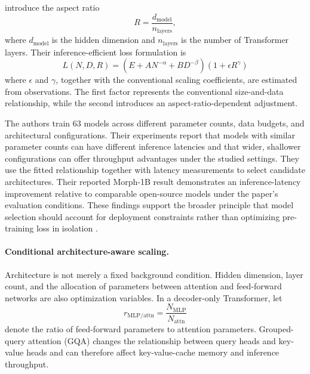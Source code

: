 \textcite{Bian2025InferenceEfficient} introduce the aspect ratio
\begin{equation}
    R=\frac{d_{\mathrm{model}}}{n_{\mathrm{layers}}},
    \label{eq:scaling-aspect-ratio}
\end{equation}
where \(d_{\mathrm{model}}\) is the hidden dimension and
\(n_{\mathrm{layers}}\) is the number of Transformer layers. Their
inference-efficient loss formulation is
\begin{equation}
    \boxed{
    L(N,D,R)
    =
    \left(E+AN^{-\alpha}+BD^{-\beta}\right)
    \left(1+\epsilon R^\gamma\right)
    }
    \label{eq:scaling-inference-efficient-law}
\end{equation}
where \(\epsilon\) and \(\gamma\), together with the conventional scaling
coefficients, are estimated from observations. The first factor represents
the conventional size-and-data relationship, while the second introduces
an aspect-ratio-dependent adjustment.

The authors train 63 models across different parameter counts, data budgets,
and architectural configurations. Their experiments report that models with
similar parameter counts can have different inference latencies and that
wider, shallower configurations can offer throughput advantages under the
studied settings. They use the fitted relationship together with latency
measurements to select candidate architectures. Their reported Morph-1B
result demonstrates an inference-latency improvement relative to comparable
open-source models under the paper's evaluation conditions. These findings
support the broader principle that model selection should account for
deployment constraints rather than optimizing pre-training loss in isolation
\parencite{Bian2025InferenceEfficient}.

\paragraph{Conditional architecture-aware scaling.}
Architecture is not merely a fixed background condition. Hidden dimension,
layer count, and the allocation of parameters between attention and
feed-forward networks are also optimization variables. In a decoder-only
Transformer, let
\begin{equation}
    r_{\mathrm{MLP/attn}}
    =
    \frac{N_{\mathrm{MLP}}}{N_{\mathrm{attn}}}
    \label{eq:scaling-mlp-attention-ratio}
\end{equation}
denote the ratio of feed-forward parameters to attention parameters.
Grouped-query attention (GQA) changes the relationship between query heads
and key-value heads and can therefore affect key-value-cache memory and
inference throughput.

